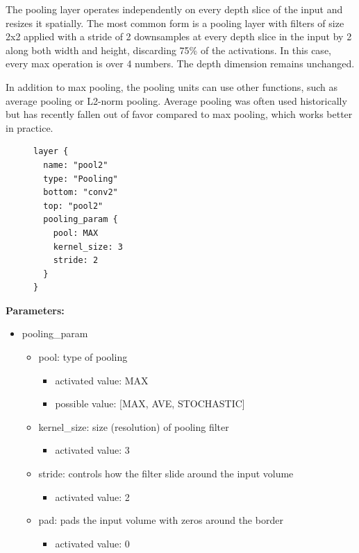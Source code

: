 \documentclass[11pt]{article}
\begin{document}
The pooling layer operates independently on every depth slice of the input and resizes it spatially. The most common form is a pooling layer with filters of size 2x2 applied with a stride of 2 downsamples at every depth slice in the input by 2 along both width and height, discarding 75\% of the activations. In this case, every max operation is over 4 numbers. The depth dimension remains unchanged.

In addition to max pooling, the pooling units can use other functions, such as average pooling or L2-norm pooling. Average pooling was often used historically but has recently fallen out of favor compared to max pooling, which works better in practice.
\begin{figure}
  \begin{center}
	\begin{verbatim}
layer {
  name: "pool2"
  type: "Pooling"
  bottom: "conv2"
  top: "pool2"
  pooling_param {
    pool: MAX
    kernel_size: 3
    stride: 2
  }
}
	\end{verbatim}
  \end{center}
\end{figure}
\textbf{Parameters:} 

\begin{itemize}
	\item pooling\_param
	\begin{itemize}
		\item pool: type of pooling
		\begin{itemize}
			\item activated value: MAX
			\item possible value: [MAX, AVE, STOCHASTIC]
		\end{itemize}
		\item kernel\_size: size (resolution) of pooling filter
		\begin{itemize}
			\item activated value: 3
		\end{itemize}
		\item stride: controls how the filter slide around the input volume
		\begin{itemize}
			\item activated value: 2
		\end{itemize}
		\item pad: pads the input volume with zeros around the border
		\begin{itemize}
			\item activated value: 0
		\end{itemize}
	\end{itemize}
\end{itemize}
\end{document}
